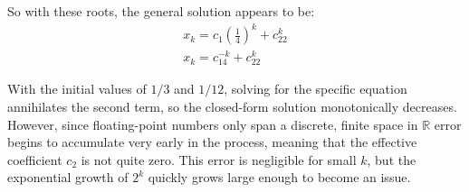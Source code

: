 \documentclass[paper=a4, fontsize=11pt]{scrartcl} %
\numberwithin{equation}{section} %
\numberwithin{figure}{section} %
\numberwithin{table}{section} %
\begin{document}
So with these roots, the general solution appears to be:
\begin{align}
	x_k = c_1(\frac{1}{4})^k + c_22^k \\
	x_k = c_14^{-k} + c_22^k
\end{align}

With the initial values of $1/3$ and $1/12$, solving for the specific equation annihilates the second term, so the closed-form solution monotonically decreases. However, since floating-point numbers only span a discrete, finite space in $\mathbb{R}$ error begins to accumulate very early in the process, meaning that the effective coefficient $c_2$ is not quite zero. This error is negligible for small $k$, but the exponential growth of $2^k$ quickly grows large enough to become an issue. 


\end{document}
